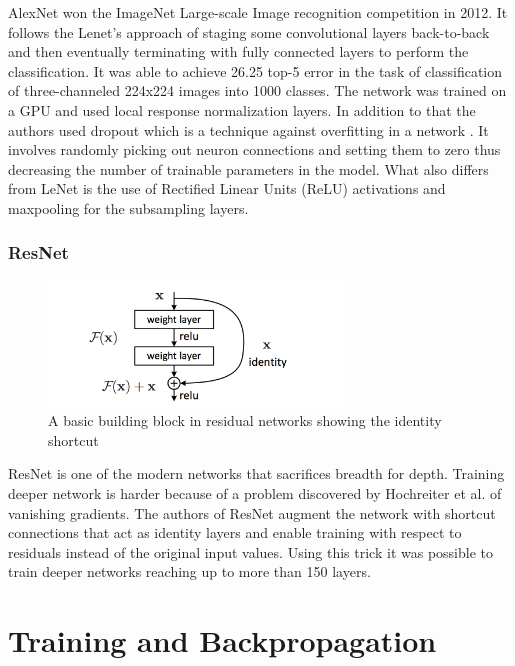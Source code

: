 AlexNet \cite{alexnet} won the ImageNet Large-scale Image recognition competition in 2012. It follows the Lenet’s approach of staging some convolutional layers back-to-back and then eventually terminating with fully connected layers to perform the classification. It was able to achieve 26.25 top-5 error in the task of classification of three-channeled 224x224 images into 1000 classes. The network was trained on a GPU \cite{alexnet} and used local response normalization layers. In addition to that the authors used dropout which is a technique against overfitting in a network \cite{dropout}. It involves randomly picking out neuron connections and setting them to zero thus decreasing the number of trainable parameters in the model. What also differs from LeNet is the use of Rectified Linear Units (ReLU) activations and maxpooling \cite{alexnet} for the subsampling layers.

\subsubsection{ResNet}

\begin{figure}[h!]
\centering
\includegraphics[width=0.7\textwidth]{Figures/residual}
\caption[Residual Learning]{ A basic building block in residual networks showing the identity shortcut  \cite{resnet}}
\label{fig:Residual Learning Basic Block}
\end{figure}

ResNet \cite{resnet} is one of the modern networks that sacrifices breadth for depth. Training deeper network is harder because of a problem discovered by Hochreiter et al. \cite{hochreiter1998vanishing} of vanishing gradients.  The authors of ResNet augment the network with shortcut connections that act as identity layers and enable training with respect to residuals instead of the original input values. Using this trick it was possible to train deeper networks reaching up to more than 150 layers. 

\section{Training and Backpropagation}

